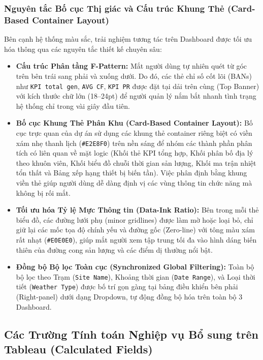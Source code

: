 \documentclass[12pt, a4paper]{report}
\begin{document}
\subsubsection{Nguyên tắc Bố cục Thị giác và Cấu trúc Khung Thẻ (Card-Based Container Layout)}

Bên cạnh hệ thống màu sắc, trải nghiệm tương tác trên Dashboard được tối ưu hóa thông qua các nguyên tắc thiết kế chuyên sâu:
\begin{itemize}[noitemsep]
    \item \textbf{Cấu trúc Phân tầng F-Pattern:} Mắt người dùng tự nhiên quét từ góc trên bên trái sang phải và xuống dưới. Do đó, các thẻ chỉ số cốt lõi (BANs) như \texttt{KPI total gen}, \texttt{AVG CF}, \texttt{KPI PR} được đặt tại dải trên cùng (Top Banner) với kích thước chữ lớn (18--24pt) để người quản lý nắm bắt nhanh tình trạng hệ thống chỉ trong vài giây đầu tiên.
    \item \textbf{Bố cục Khung Thẻ Phân Khu (Card-Based Container Layout):} Bố cục trực quan của dự án sử dụng các khung thẻ container riêng biệt có viền xám nhẹ thanh lịch (\texttt{\#E2E8F0}) trên nền sáng để nhóm các thành phần phân tích có liên quan về mặt logic (Khối thẻ KPI tổng hợp, Khối phân bố địa lý theo khuôn viên, Khối biểu đồ chuỗi thời gian sản lượng, Khối ma trận nhiệt tổn thất và Bảng xếp hạng thiết bị biến tần). Việc phân định bằng khung viền thẻ giúp người dùng dễ dàng định vị các vùng thông tin chức năng mà không bị rối mắt.
    \item \textbf{Tối ưu hóa Tỷ lệ Mực Thông tin (Data-Ink Ratio):} Bên trong mỗi thẻ biểu đồ, các đường lưới phụ (minor gridlines) được làm mờ hoặc loại bỏ, chỉ giữ lại các mốc tọa độ chính yếu và đường gốc (Zero-line) với tông màu xám rất nhạt (\texttt{\#E0E0E0}), giúp mắt người xem tập trung tối đa vào hình dáng biến thiên của đường cong sản lượng và các điểm dị thường nổi bật.
    \item \textbf{Đồng bộ Bộ lọc Toàn cục (Synchronized Global Filtering):} Toàn bộ bộ lọc theo Trạm (\texttt{Site Name}), Khoảng thời gian (\texttt{Date Range}), và Loại thời tiết (\texttt{Weather Type}) được bố trí gọn gàng tại bảng điều khiển bên phải (Right-panel) dưới dạng Dropdown, tự động đồng bộ hóa trên toàn bộ 3 Dashboard.
\end{itemize}

\subsection{Các Trường Tính toán Nghiệp vụ Bổ sung trên Tableau (Calculated Fields)}
\label{subsec:calculated_fields}
\end{document}
